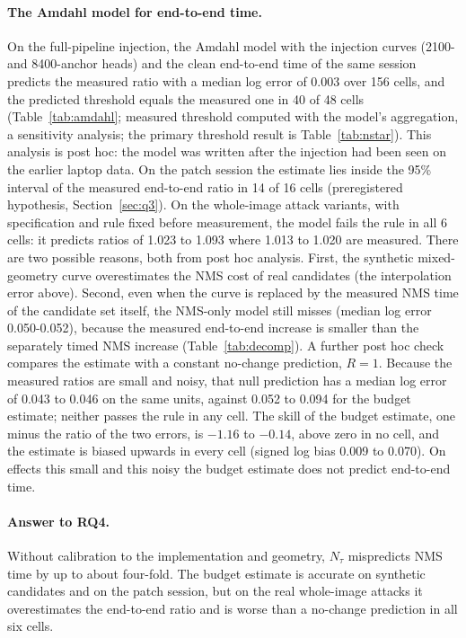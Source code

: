 \documentclass[a4paper,fleqn]{cas-dc}
\newcommand{\Ntau}{N_{\tau}}
\begin{document}
\paragraph{The Amdahl model for end-to-end time.}
On the full-pipeline injection, the Amdahl model with the injection curves (2100- and 8400-anchor heads) and the clean end-to-end time of the same session predicts the measured ratio with a median log error of 0.003 over 156 cells, and the predicted threshold equals the measured one in 40 of 48 cells (Table~\ref{tab:amdahl}; measured threshold computed with the model's aggregation, a sensitivity analysis; the primary threshold result is Table~\ref{tab:nstar}). This analysis is post hoc: the model was written after the injection had been seen on the earlier laptop data. On the patch session the estimate lies inside the 95\% interval of the measured end-to-end ratio in 14 of 16 cells (preregistered hypothesis, Section~\ref{sec:q3}). On the whole-image attack variants, with specification and rule fixed before measurement, the model fails the rule in all 6 cells: it predicts ratios of 1.023 to 1.093 where 1.013 to 1.020 are measured. There are two possible reasons, both from post hoc analysis. First, the synthetic mixed-geometry curve overestimates the NMS cost of real candidates (the interpolation error above). Second, even when the curve is replaced by the measured NMS time of the candidate set itself, the NMS-only model still misses (median log error 0.050-0.052), because the measured end-to-end increase is smaller than the separately timed NMS increase (Table~\ref{tab:decomp}). A further post hoc check compares the estimate with a constant no-change prediction, $R=1$. Because the measured ratios are small and noisy, that null prediction has a median log error of 0.043 to 0.046 on the same units, against 0.052 to 0.094 for the budget estimate; neither passes the rule in any cell. The skill of the budget estimate, one minus the ratio of the two errors, is $-1.16$ to $-0.14$, above zero in no cell, and the estimate is biased upwards in every cell (signed log bias 0.009 to 0.070). On effects this small and this noisy the budget estimate does not predict end-to-end time.

\paragraph{Answer to RQ4.} Without calibration to the implementation and geometry, $\Ntau$ mispredicts NMS time by up to about four-fold. The budget estimate is accurate on synthetic candidates and on the patch session, but on the real whole-image attacks it overestimates the end-to-end ratio and is worse than a no-change prediction in all six cells.
\end{document}
